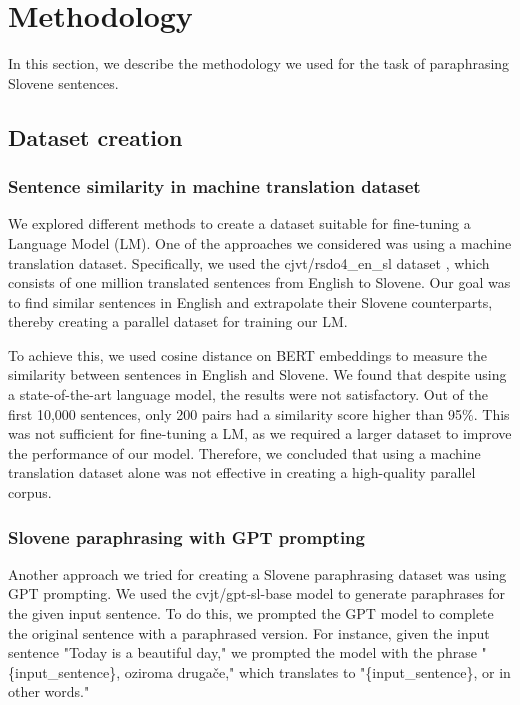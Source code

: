 \documentclass[fleqn,moreauthors,10pt]{ds_report}
\begin{document}
\section*{Methodology}

In this section, we describe the methodology we used for the task of paraphrasing Slovene sentences.

\subsection*{Dataset creation}

\subsubsection*{Sentence similarity in machine translation dataset}
We explored different methods to create a dataset suitable for fine-tuning a Language Model (LM). One of the approaches we considered was using a machine translation dataset. Specifically, we used the cjvt/rsdo4\_en\_sl dataset \cite{rsdo4_en_sl}, which consists of one million translated sentences from English to Slovene. Our goal was to find similar sentences in English and extrapolate their Slovene counterparts, thereby creating a parallel dataset for training our LM.

To achieve this, we used cosine distance on BERT embeddings \cite{reimers-2019-sentence-bert} to measure the similarity between sentences in English and Slovene. We found that despite using a state-of-the-art language model, the results were not satisfactory. Out of the first 10,000 sentences, only 200 pairs had a similarity score higher than 95\%. This was not sufficient for fine-tuning a LM, as we required a larger dataset to improve the performance of our model. Therefore, we concluded that using a machine translation dataset alone was not effective in creating a high-quality parallel corpus.

\subsubsection*{Slovene paraphrasing with GPT prompting}
Another approach we tried for creating a Slovene paraphrasing dataset was using GPT prompting. We used the cvjt/gpt-sl-base model \cite{huggingface_gptslbase} to generate paraphrases for the given input sentence. To do this, we prompted the GPT model to complete the original sentence with a paraphrased version. For instance, given the input sentence "Today is a beautiful day," we prompted the model with the phrase "\{input\_sentence\}, oziroma drugače," which translates to "\{input\_sentence\}, or in other words."
\end{document}
